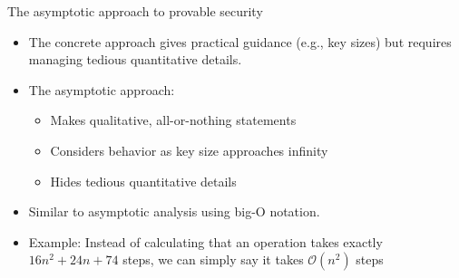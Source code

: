 \documentclass[aspectratio=169, lualatex, handout]{beamer}
\begin{document}
\begin{frame}{The asymptotic approach to provable security}
	\begin{itemize}
		\item The concrete approach gives practical guidance (e.g., key sizes) but requires managing tedious quantitative details.
		\item The asymptotic approach:
		      \begin{itemize}
			      \item Makes qualitative, all-or-nothing statements
			      \item Considers behavior as key size approaches infinity
			      \item Hides tedious quantitative details
		      \end{itemize}
		\item Similar to asymptotic analysis using big-O notation.
		\item Example: Instead of calculating that an operation takes exactly $16n^2 + 24n + 74$ steps, we can simply say it takes $\mathcal{O}(n^2)$ steps
	\end{itemize}
\end{frame}
\end{document}
